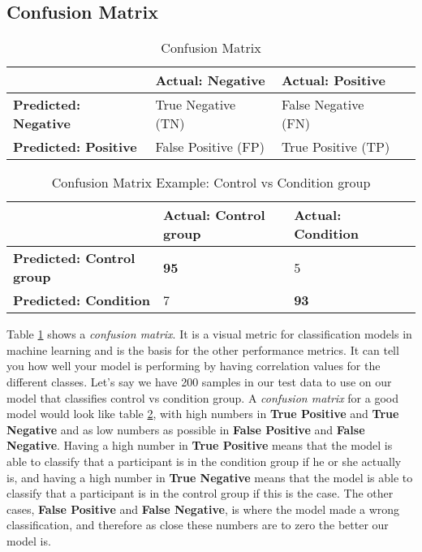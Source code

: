 \subsection{Confusion Matrix}

\begin{table}
  \begin{center}
    \begin{tabular}{| l | l | l | l |}
      \hline
                                    & \textbf{Actual: Negative} & \textbf{Actual: Positive} \\ \hline
      \textbf{Predicted: Negative}  & True Negative (TN)        & False Negative (FN)       \\ \hline
      \textbf{Predicted: Positive}  & False Positive (FP)       & True Positive (TP)        \\
      \hline
    \end{tabular}
    \caption{Confusion Matrix}
    \label{table:confusion_matrix}
  \end{center}
\end{table}

\begin{table}
  \begin{center}
    \begin{tabular}{| l | l | l | l |}
      \hline
                                      & \textbf{Actual: Control group} & \textbf{Actual: Condition} \\ \hline
      \textbf{Predicted: Control group} & \textbf{95}                  & 5                        \\ \hline
      \textbf{Predicted: Condition}     & 7                            & \textbf{93}              \\
      \hline
    \end{tabular}
    \caption{Confusion Matrix Example: Control vs Condition group}
    \label{table:confusion_matrix_bipolar}
  \end{center}
\end{table}

Table \ref{table:confusion_matrix} shows a \textit{confusion matrix}. It is a visual metric for classification models in machine learning and is the basis for 
the other performance metrics. It can tell you how well your model is performing by having correlation values for the different classes. 
Let’s say we have 200 samples in our test data to use on our model that classifies control vs condition group. 
A \textit{confusion matrix} for a good model would look like table \ref{table:confusion_matrix_bipolar}, 
with high numbers in \textbf{True Positive} and \textbf{True Negative} and as low numbers as possible in 
\textbf{False Positive} and \textbf{False Negative}. Having a high number in \textbf{True Positive} means that the model is able to classify that a 
participant is in the condition group if he or she actually is, and having a high number in \textbf{True Negative} means that the model is able to classify 
that a participant is in the control group if this is the case. The other cases, \textbf{False Positive} and \textbf{False Negative}, is where the model
made a wrong classification, and therefore as close these numbers are to zero the better our model is.

